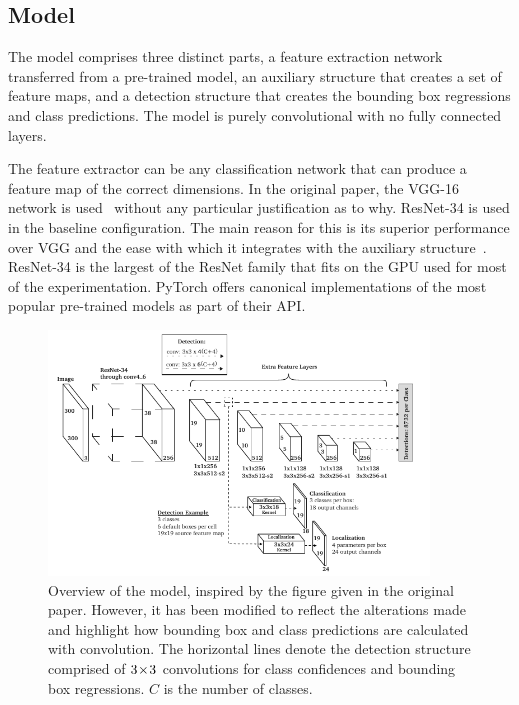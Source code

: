 \subsection{Model}
The model comprises three distinct parts, a feature extraction network transferred from a pre-trained model, an auxiliary structure that creates a set of feature maps, and a detection structure that creates the bounding box regressions and class predictions.
The model is purely convolutional with no fully connected layers.

The feature extractor can be any classification network that can produce a feature map of the correct dimensions.
In the original paper, the VGG-16 network is used\ \parencite{simonyan2015deep} without any particular justification as to why.
ResNet-34 is used in the baseline configuration.
The main reason for this is its superior performance over VGG and the ease with which it integrates with the auxiliary structure\ \parencite{he2015deep}.
ResNet-34 is the largest of the ResNet family that fits on the GPU used for most of the experimentation.
PyTorch offers canonical implementations of the most popular pre-trained models as part of their API\@.

\begin{figure}[htb]
  \centering
  \includegraphics[width=0.9\textwidth]{figs/method/model.pdf}
  \caption[Model architecture overview]{Overview of the model, inspired by the figure given in the original paper. However, it has been modified to reflect the alterations made and highlight how bounding box and class predictions are calculated with convolution.
The horizontal lines denote the detection structure comprised of \(3\!\times \! 3\) convolutions for class confidences and bounding box regressions. \(C\) is the number of classes.}\label{fig:model}
\end{figure}


